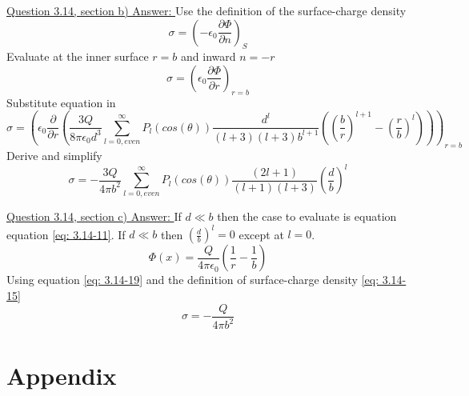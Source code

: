 \documentclass[12pt]{article}
\begin{document}
    \underline{Question 3.14, section b) Answer: }
    Use the definition of the surface-charge density
    \begin{equation} \label{eq: 3.14-15}
        \sigma = \left(-\epsilon_0 \frac{\partial \Phi}{\partial n} \right)_S
    \end{equation}
    Evaluate at the inner surface $r=b$ and inward $n=-r$
    \begin{equation} \label{eq: 3.14-16}
        \sigma = \left(\epsilon_0 \frac{\partial \Phi}{\partial r} \right)_{r=b}
    \end{equation}
    Substitute equation in
    \begin{equation} \label{eq: 3.14-17}
        \sigma = \left(\epsilon_0 \frac{\partial }{\partial r} \left( \frac{3 Q}{8 \pi \epsilon_0 d^3} \sum_{l=0, even}^\infty P_l(cos(\theta)) \frac{d^l}{(l+3)(l+3)b^{l+1}} \left(\left(\frac{b}{r} \right)^{l+1} - \left( \frac{r}{b} \right)^l \right) \right) \right)_{r=b}
    \end{equation}
    Derive and simplify
    \begin{equation} \label{eq: 3.14-18}
        \sigma = -\frac{3 Q}{4 \pi b^2} \sum_{l=0, even}^\infty P_l(cos(\theta)) \frac{(2l+1)}{(l+1)(l+3)} \left(\frac{d}{b} \right)^l
    \end{equation}
    
    \underline{Question 3.14, section c) Answer: }
    If $d \ll b$ then the case to evaluate is equation equation \ref{eq: 3.14-11}.
    \newline If $d \ll b$ then $\left(\frac{d}{b} \right)^l = 0$ except at $l=0$.
    \begin{equation} \label{eq: 3.14-19}
        \Phi(x) = \frac{Q}{4 \pi \epsilon_0} \left(\frac{1}{r} - \frac{1}{b} \right)
    \end{equation}
    Using equation \ref{eq: 3.14-19} and the definition of surface-charge density \ref{eq: 3.14-15}
    \begin{equation} \label{eq: 3.14-20}
        \sigma = -\frac{Q}{4 \pi b^2}
    \end{equation}
    

\section{Appendix} 
\end{document}
